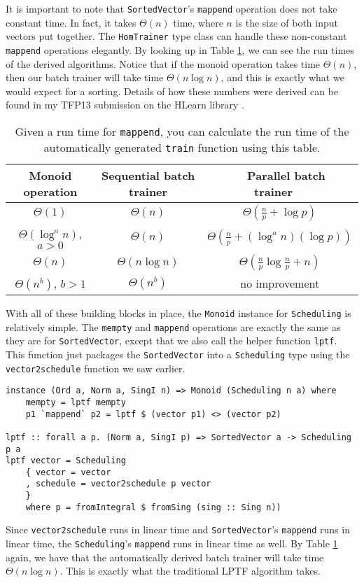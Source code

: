\documentclass[tikz]{tmr}
\newcommand\h{\lstinline}
\newcommand\+{\mdoubleplus}
\begin{document}
It is important to note that \h{SortedVector}'s \h{mappend} operation does not take constant time.
In fact, it takes $\Theta(n)$ time, where $n$ is the size of both input vectors put together.
The \h{HomTrainer} type class can handle these non-constant \h{mappend} operations elegantly.
By looking up in Table \ref{table:rt}, we can see the run times of the derived algorithms.
Notice that if the monoid operation takes time $\Theta(n)$, then our batch trainer will take time $\Theta(n\log n)$, and this is exactly what we would expect for a sorting.
Details of how these numbers were derived can be found in my TFP13 submission on the HLearn library \cite{me_tfp13}.

\begin{table}[H]
\caption{Given a run time for \h{mappend}, you can calculate the run time of the automatically generated \h{train} function using this table.}
\label{table:rt}
\centering
\begin{tabular}{ c | c | c}
\hline
Monoid operation & Sequential batch trainer & \ \ Parallel batch trainer\ \ \\
\hline \hline
$\Theta(1)$ & $\Theta(n)$ & $\Theta\left(\frac{n}{p}+\log p\right)$\\
$\Theta(\log^a n)$, $a>0$ & $\Theta(n)$ & $\Theta\left(\frac{n}{p}+(\log^a n)(\log p)\right)$\\
$\Theta(n)$ & $\Theta(n\log n)$ & $\Theta\left(\frac{n}{p}\log\frac{n}{p}+n\right)$\\
$\Theta(n^b)$, $b>1$ & $\Theta(n^b)$ & no improvement\\
\hline
\end{tabular}
\end{table}

With all of these building blocks in place, the \h{Monoid} instance for \h{Scheduling} is relatively simple.
The \h{mempty} and \h{mappend} operations are exactly the same as they are for \h{SortedVector}, except that we also call the helper function \h{lptf}.
This function just packages the \h{SortedVector} into a \h{Scheduling} type using the \h{vector2schedule} function we saw earlier.
\begin{lstlisting}
instance (Ord a, Norm a, SingI n) => Monoid (Scheduling n a) where
    mempty = lptf mempty
    p1 `mappend` p2 = lptf $ (vector p1) <> (vector p2)
    
lptf :: forall a p. (Norm a, SingI p) => SortedVector a -> Scheduling p a
lptf vector = Scheduling
    { vector = vector
    , schedule = vector2schedule p vector
    }
    where p = fromIntegral $ fromSing (sing :: Sing n))
\end{lstlisting}
Since \h{vector2schedule} runs in linear time and \h{SortedVector}'s \h{mappend} runs in linear time, the \h{Scheduling}'s \h{mappend} runs in linear time as well.
By Table \ref{table:rt} again, we have that the automatically derived batch trainer will take time $\Theta(n\log n)$.
This is exactly what the traditional LPTF algorithm takes.
\end{document}
